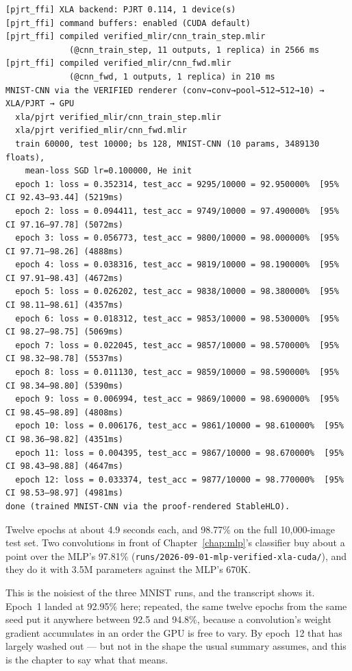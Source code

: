 \begin{verbatim}
[pjrt_ffi] XLA backend: PJRT 0.114, 1 device(s)
[pjrt_ffi] command buffers: enabled (CUDA default)
[pjrt_ffi] compiled verified_mlir/cnn_train_step.mlir
             (@cnn_train_step, 11 outputs, 1 replica) in 2566 ms
[pjrt_ffi] compiled verified_mlir/cnn_fwd.mlir
             (@cnn_fwd, 1 outputs, 1 replica) in 210 ms
MNIST-CNN via the VERIFIED renderer (conv→conv→pool→512→512→10) → XLA/PJRT → GPU
  xla/pjrt verified_mlir/cnn_train_step.mlir
  xla/pjrt verified_mlir/cnn_fwd.mlir
  train 60000, test 10000; bs 128, MNIST-CNN (10 params, 3489130 floats),
    mean-loss SGD lr=0.100000, He init
  epoch 1: loss = 0.352314, test_acc = 9295/10000 = 92.950000%  [95% CI 92.43–93.44] (5219ms)
  epoch 2: loss = 0.094411, test_acc = 9749/10000 = 97.490000%  [95% CI 97.16–97.78] (5072ms)
  epoch 3: loss = 0.056773, test_acc = 9800/10000 = 98.000000%  [95% CI 97.71–98.26] (4888ms)
  epoch 4: loss = 0.038316, test_acc = 9819/10000 = 98.190000%  [95% CI 97.91–98.43] (4672ms)
  epoch 5: loss = 0.026202, test_acc = 9838/10000 = 98.380000%  [95% CI 98.11–98.61] (4357ms)
  epoch 6: loss = 0.018312, test_acc = 9853/10000 = 98.530000%  [95% CI 98.27–98.75] (5069ms)
  epoch 7: loss = 0.022045, test_acc = 9857/10000 = 98.570000%  [95% CI 98.32–98.78] (5537ms)
  epoch 8: loss = 0.011130, test_acc = 9859/10000 = 98.590000%  [95% CI 98.34–98.80] (5390ms)
  epoch 9: loss = 0.006994, test_acc = 9869/10000 = 98.690000%  [95% CI 98.45–98.89] (4808ms)
  epoch 10: loss = 0.006176, test_acc = 9861/10000 = 98.610000%  [95% CI 98.36–98.82] (4351ms)
  epoch 11: loss = 0.004395, test_acc = 9867/10000 = 98.670000%  [95% CI 98.43–98.88] (4647ms)
  epoch 12: loss = 0.033374, test_acc = 9877/10000 = 98.770000%  [95% CI 98.53–98.97] (4981ms)
done (trained MNIST-CNN via the proof-rendered StableHLO).
\end{verbatim}

Twelve epochs at about 4.9 seconds each, and 98.77\% on the full
10,000-image test set. Two convolutions in front of
Chapter~\ref{chap:mlp}'s classifier buy about a point over the MLP's 97.81\%
(\texttt{runs/2026-09-01-mlp-verified-xla-cuda/}), and they do it with 3.5M parameters against the MLP's 670K.

This is the noisiest of the three MNIST runs, and the transcript shows it.
Epoch~1 landed at 92.95\% here; repeated, the same twelve epochs from the
same seed put it anywhere between 92.5 and 94.8\%, because a convolution's
weight gradient accumulates in an order the GPU is free to vary. By
epoch~12 that has largely washed out --- but not in the shape the usual
summary assumes, and this is the chapter to say what that means.

